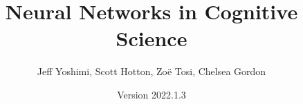 \documentclass[oneside]{book}
\begin{document}
\title{Neural Networks in Cognitive Science}
\author{Jeff Yoshimi, Scott Hotton, Zo\"e Tosi, Chelsea Gordon}
\date{Version 2022.1.3}  %
\maketitle

\tableofcontents


















\appendix


{} 
\listoffigures

{} 
{}

\end{document}
